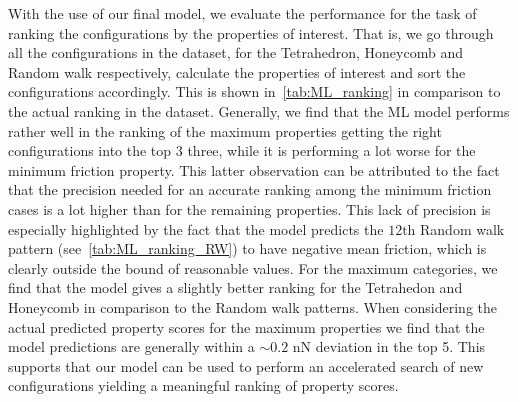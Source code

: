 With the use of our final model, we evaluate the performance for the task of
ranking the configurations by the properties of interest. That is, we go through
all the configurations in the dataset, for the Tetrahedron, Honeycomb and Random
walk respectively, calculate the properties of interest and sort the
configurations accordingly. This is shown in~\cref{tab:ML_ranking} in comparison to the actual
ranking in the dataset. Generally, we find that the \acrshort{ML} model performs
rather well in the ranking of the maximum properties getting the right
configurations into the top 3 three, while it is performing a lot worse for the
minimum friction property. This latter observation can be
attributed to the fact that the precision needed for an accurate ranking among
the minimum friction cases is a lot higher than for the remaining properties. This lack of precision is especially highlighted by the fact that the model predicts the $12\text{th}$ Random walk pattern (see~\cref{tab:ML_ranking_RW}) to have negative mean friction, which is clearly outside the bound of reasonable values. For the maximum categories, we find that the model gives a slightly
better ranking for the Tetrahedon and Honeycomb in comparison to the Random walk
patterns. When considering the actual predicted property scores for the maximum
properties we find that the model predictions are generally within a $\sim 0.2$
nN deviation in the top 5. This supports that our model can be used to perform
an accelerated search of new configurations yielding a meaningful ranking of
property scores. 


